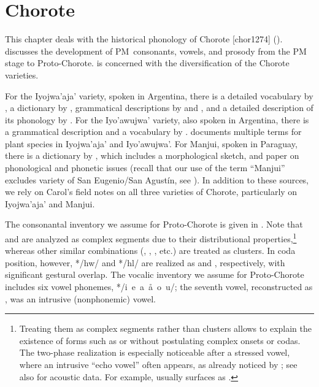 \chapter{Chorote} \label{ch}

This chapter deals with the historical phonology of Chorote [chor1274] ().  discusses the development of PM~consonants, vowels, and prosody from the PM stage to Proto-Chorote.  is concerned with the diversification of the Chorote varieties.

For the Iyojwa’aja’ variety, spoken in Argentina, there is a detailed vocabulary by \citet{AG79}, a dictionary by \citet{ND09}, grammatical descriptions by \citet{AG78} and \citet{JC14a}, and a detailed description of its phonology by \citet{JC14b}. For the Iyo’awujwa’ variety, also spoken in Argentina, there is a grammatical description and a vocabulary by \citet{AG83}. \citet{GS10} documents multiple terms for plant species in Iyojwa’aja’ and Iyo’awujwa’. For Manjui, spoken in Paraguay, there is a dictionary by \citet{JC18}, which includes a morphological sketch, and  paper on phonological and phonetic issues (recall that our use of the term ``Manjui'' excludes variety of San Eugenio/San Agustín, see ). In addition to these sources, we rely on Carol's field notes on all three varieties of Chorote, particularly on Iyojwa’aja’ and Manjui.

The consonantal inventory we assume for Proto-Chorote is given in . Note that  and  are analyzed as complex segments due to their distributional properties,\footnote{Treating them as complex segments rather than clusters allows to explain the existence of forms such as  or  without postulating complex onsets or codas. The two-phase realization is especially noticeable after a stressed vowel, where an intrusive ``echo vowel'' often appears, as already noticed by \citet[24–26]{AG83}; see also \citet[80]{JC14b} for acoustic data. For example,  usually surfaces as .} whereas other similar combinations (, , , etc.) are treated as clusters. In coda position, however, */hw/ and */hl/ are realized as  and , respectively, with significant gestural overlap. The vocalic inventory we assume for Proto-Chorote includes six vowel phonemes, */i~e~a~å~o~u/; the seventh vowel, reconstructed as , was an intrusive (nonphonemic) vowel.

